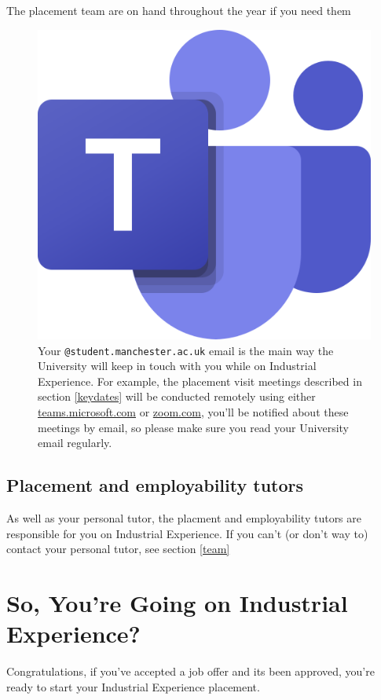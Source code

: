 \documentclass[
]{book}
\begin{document}
The placement team are on hand throughout the year if you need them

\begin{figure}

{\centering \includegraphics[width=0.5\linewidth]{images/msteams} 

}

\caption{Your \texttt{@student.manchester.ac.uk} email is the main way the University will keep in touch with you while on Industrial Experience. For example, the placement visit meetings described in section \ref{keydates} will be conducted remotely using either \href{https://teams.microsoft.com}{teams.microsoft.com} or \href{https://www.zoom.com}{zoom.com}, you'll be notified about these meetings by email, so please make sure you read your University email regularly.}\label{fig:teams-fig}
\end{figure}



\section{Placement and employability tutors}\label{ptutor}

As well as your personal tutor, the placment and employability tutors are responsible for you on Industrial Experience. If you can't (or don't way to) contact your personal tutor, see section \ref{team}

\chapter{So, You're Going on Industrial Experience?}\label{starting}

Congratulations, if you've accepted a job offer and its been approved, you're ready to start your Industrial Experience placement.
\end{document}

